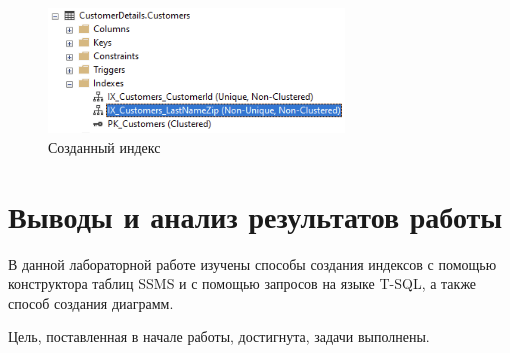 \documentclass[a4paper, 14pt]{extarticle}
\begin{document}
\begin{figure}[H]
  \centering
  \includegraphics[width=0.7\textwidth]{images/task-7/2.png}
  \caption{Созданный индекс}
  \label{fig:task-7-2}
\end{figure}

\section{Выводы и анализ результатов работы}

В данной лабораторной работе изучены способы создания индексов с помощью
конструктора таблиц SSMS и с помощью запросов на языке T-SQL, а также способ
создания диаграмм.

Цель, поставленная в начале работы, достигнута, задачи выполнены.
\end{document}
